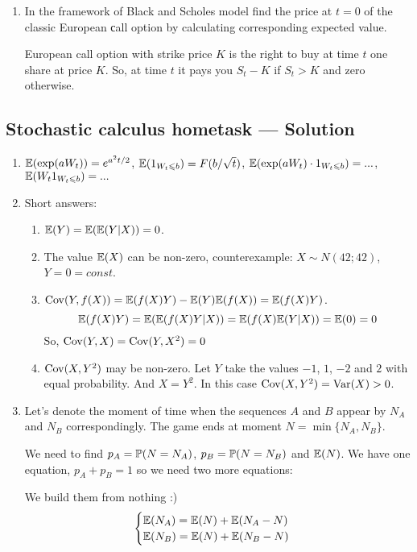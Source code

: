 \documentclass[12pt, a4paper]{article}
\begin{document}
\begin{enumerate}
\item In the framework of Black and Scholes model find the price at $t=0$ of the classic European сall option by calculating corresponding expected value.

European call option with strike price $K$ is the right to buy at time $t$ one share at price $K$. So, at time $t$ it pays you $S_t - K$ if $S_t > K$ and zero otherwise.

\end{enumerate}




\subsection{Stochastic calculus hometask — Solution}

\begin{enumerate}

\item $\E(\exp(aW_t))=e^{a^2t/2}$, $\E(1_{W_t\leq b})=F(b/\sqrt{t})$, $\E(\exp(aW_t)\cdot 1_{W_t\leq b})=...$, $\E(W_t 1_{W_t\leq b})=...$
\item Short answers:

\begin{enumerate}
\item $\E(Y)=\E(\E(Y|X))=0$.
\item The value $\E(X)$ can be non-zero, counterexample: $X\sim N(42; 42)$, $Y=0=const$.
\item $\Cov(Y, f(X)) = \E(f(X)Y) - \E(Y)\E(f(X))=\E(f(X)Y)$.
\[
\E(f(X)Y)= \E(\E(f(X)Y|X))=\E(f(X)\E(Y|X))=\E(0)=0
\]
So, $\Cov(Y,X)=\Cov(Y,X^2)=0$
\item $\Cov(X, Y^2)$ may be non-zero. Let $Y$ take the values $-1$, $1$, $-2$ and $2$ with equal probability. And $X=Y^2$. In this case $\Cov(X, Y^2)=\Var(X)>0$.
\end{enumerate}

\item Let's denote the moment of time when the sequences $A$ and $B$ appear by $N_A$ and $N_B$ correspondingly. The game ends at moment $N=\min \{N_A, N_B\}$.

We need to find $p_A = \P(N=N_A)$, $p_B=\P(N=N_B)$ and $\E(N)$. We have one equation, $p_A + p_B = 1$ so we need two more equations:

We build them from nothing :)
\[
\begin{cases}
\E(N_A) = \E(N) + \E(N_A - N) \\
\E(N_B) = \E(N) + \E(N_B - N) \\
\end{cases}
\]


\end{enumerate}
\end{document}
